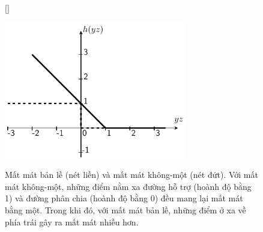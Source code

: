 \begin{figure}[t]
[\FBwidth]
{\caption{
Mất mát bản lề (nét liền) và mất mát không-một (nét đứt). Với mất mát không-một, những
điểm nằm xa đường hỗ trợ (hoành độ bằng 1) và đường phân chia (hoành độ bằng 0) đều mang lại mất mát bằng một. Trong khi đó, với mất mát bản lề, những điểm ở xa về
phía trái gây ra mất mát nhiều hơn. }
\label{fig:20_3}}
{ %
\includegraphics[width=8cm]{Chapters/09_SupportVectorMachines/20_softmarginsvm/latex/hinge.pdf}
}
\end{figure}



